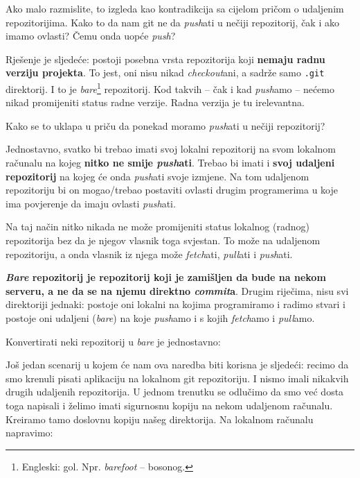 Ako malo razmislite, to izgleda kao kontradikcija sa cijelom pričom o udaljenim repozitorijima.
Kako to da nam git ne da \emph{push}ati u nečiji repozitorij, čak i ako imamo ovlasti?
Čemu onda uopće \emph{push}?

Rješenje je sljedeće: postoji posebna vrsta repozitorija koji \textbf{nemaju radnu verziju projekta}.
To jest, oni nisu nikad \emph{checkout}ani, a sadrže samo \verb+.git+ direktorij.
I to je \emph{bare}\footnote{Engleski: gol. Npr. \emph{barefoot} -- bosonog.} repozitorij.
Kod takvih -- čak i kad \emph{push}amo -- nećemo nikad promijeniti status radne verzije.
Radna verzija je tu irelevantna.

Kako se to uklapa u priču da ponekad moramo \emph{push}ati u nečiji repozitorij?

Jednostavno, svatko bi trebao imati svoj lokalni repozitorij na svom lokalnom računalu na kojeg \textbf{nitko ne smije \emph{push}ati}.
Trebao bi imati i \textbf{svoj udaljeni repozitorij} na kojeg će onda \emph{push}ati svoje izmjene.
Na tom udaljenom repozitoriju bi on mogao/trebao postaviti ovlasti drugim programerima u koje ima povjerenje da imaju ovlasti \emph{push}ati.

Na taj način nitko nikada ne može promijeniti status lokalnog (radnog) repozitorija bez da je njegov vlasnik toga svjestan.
To može na udaljenom repozitoriju, a onda vlasnik iz njega može \emph{fetch}ati, \emph{pull}ati i \emph{push}ati.

\textbf{\emph{Bare} repozitorij je repozitorij koji je zamišljen da bude na nekom serveru, a ne da se na njemu direktno \emph{commit}a}.
Drugim riječima, nisu svi direktoriji jednaki: 
postoje oni lokalni na kojima programiramo i radimo stvari i postoje oni udaljeni (\emph{bare}) na koje \emph{push}amo i s kojih \emph{fetch}amo i \emph{pull}amo.

Konvertirati neki repozitorij u \emph{bare} je jednostavno:


Još jedan scenarij u kojem će nam ova naredba biti korisna je sljedeći: recimo da smo krenuli pisati aplikaciju na lokalnom git repozitoriju.
I nismo imali nikakvih drugih udaljenih repozitorija.
U jednom trenutku se odlučimo da smo već dosta toga napisali i želimo imati sigurnosnu kopiju na nekom udaljenom računalu.
Kreiramo tamo doslovnu kopiju našeg direktorija.
Na lokalnom računalu napravimo:


